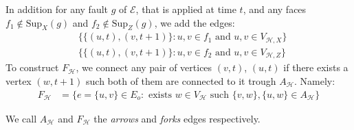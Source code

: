 \begin{definition}
\begin{enumerate}
\begin{enumerate}
        \end{enumerate}
        In addition for any fault $g$ of $\mathcal{E}$, that is applied at time $t$, and any faces $f_{1} \notin \text{Sup}_{X}(g)$ and $f_{2} \notin \text{Sup}_{Z}(g)$, we add the edges:
            \begin{equation*}
              \begin{split}
                & \bigl\{  \{(u,t),(v,t+1)\} : u,v \in f_{1} \text{ and } u,v \in V_{\mathcal{H},X} \bigr\} \\
                & \bigl\{  \{(u,t),(v,t+1)\} : u,v \in f_{2}\text{ and } u,v \in V_{\mathcal{H},Z} \bigr\} 
              \end{split}
            \end{equation*}
            To construct $F_{\mathcal{H}}$, we connect any pair of vertices $(v,t)$, $(u,t)$ if there exists a vertex $(w,t+1)$ such both of them are connected to it trough $A_{\mathcal{H}}$. Namely: 
        \begin{equation*}
          \begin{split}
            F_{\mathcal{H}} &= \big\{ e = \{u,v\} \in E_{o} : \text{ exists } w \in V_{\mathcal{H}} \text{ such } \{v,w\},\{u,w\} \in A_{\mathcal{H}} \big\} 
          \end{split}
        \end{equation*}
    \end{enumerate}
    We call $A_{\mathcal{H}}$ and $F_{\mathcal{H}}$ the \textit{arrows} and \textit{forks} edges respectively. 
\end{definition}







